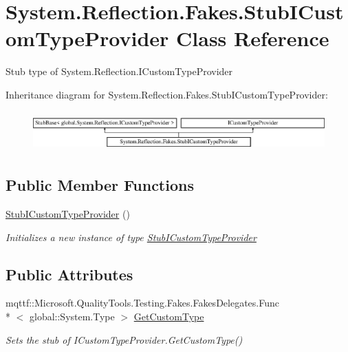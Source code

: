 \hypertarget{class_system_1_1_reflection_1_1_fakes_1_1_stub_i_custom_type_provider}{\section{System.\-Reflection.\-Fakes.\-Stub\-I\-Custom\-Type\-Provider Class Reference}
\label{class_system_1_1_reflection_1_1_fakes_1_1_stub_i_custom_type_provider}
}


Stub type of System.\-Reflection.\-I\-Custom\-Type\-Provider 


Inheritance diagram for System.\-Reflection.\-Fakes.\-Stub\-I\-Custom\-Type\-Provider\-:\begin{figure}[H]
\begin{center}
\leavevmode
\includegraphics[height=1.555556cm]{class_system_1_1_reflection_1_1_fakes_1_1_stub_i_custom_type_provider}
\end{center}
\end{figure}
\subsection*{Public Member Functions}
\begin{DoxyCompactItemize}
\item 
\hyperlink{class_system_1_1_reflection_1_1_fakes_1_1_stub_i_custom_type_provider_a57bc84a0f5be5b30a74d5e383fc513fd}{Stub\-I\-Custom\-Type\-Provider} ()
\begin{DoxyCompactList}\small\item\em Initializes a new instance of type \hyperlink{class_system_1_1_reflection_1_1_fakes_1_1_stub_i_custom_type_provider}{Stub\-I\-Custom\-Type\-Provider}\end{DoxyCompactList}\end{DoxyCompactItemize}
\subsection*{Public Attributes}
\begin{DoxyCompactItemize}
\item 
mqttf\-::\-Microsoft.\-Quality\-Tools.\-Testing.\-Fakes.\-Fakes\-Delegates.\-Func\\*
$<$ global\-::\-System.\-Type $>$ \hyperlink{class_system_1_1_reflection_1_1_fakes_1_1_stub_i_custom_type_provider_a30ab98a8f3adf1707eb3a68a2f6d8444}{Get\-Custom\-Type}
\begin{DoxyCompactList}\small\item\em Sets the stub of I\-Custom\-Type\-Provider.\-Get\-Custom\-Type()\end{DoxyCompactList}\end{DoxyCompactItemize}


